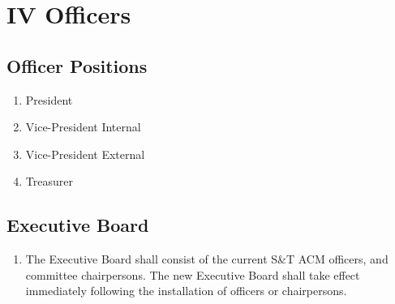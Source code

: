 \section{IV \textendash{} Officers}
  \subsection{ Officer Positions}
    \begin{enumerate}[label=\arabic*.]
      \item President
      \item Vice-President Internal
      \item Vice-President External
      \item Treasurer
    \end{enumerate}
  \subsection{Executive Board}
    \begin{enumerate}[label=\arabic*.]
      \item The Executive Board shall consist of the current S\&T ACM officers,
      and committee chairpersons. The new Executive Board shall take effect
      immediately following the installation of officers or chairpersons.
    \end{enumerate}
